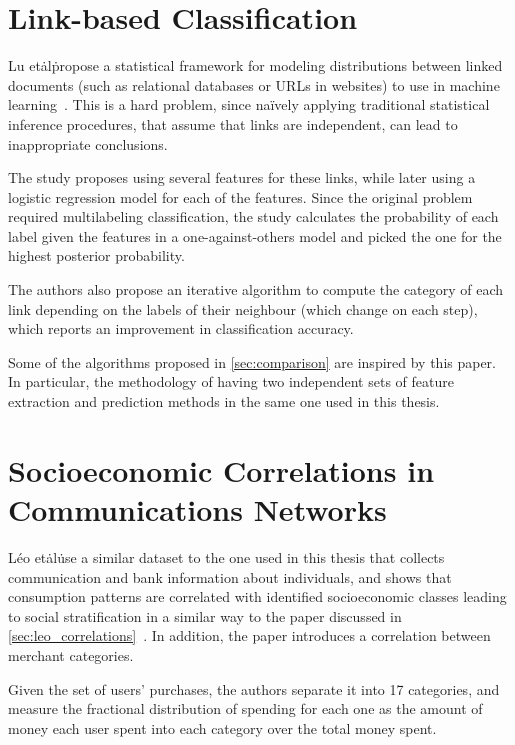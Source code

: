 \section{Link-based Classification}

Lu et\. al\. propose a statistical framework for modeling distributions between linked documents (such as relational databases or URLs in websites) to use in machine learning~\cite{lu2003link}. This is a hard problem, since naïvely applying traditional statistical inference procedures, that assume that links are independent, can lead to inappropriate conclusions\cite{jensen1999statistical}.

The study proposes using several features for these links, while later using a logistic regression model for each of the features. Since the original problem required multilabeling classification, the study calculates the probability of each label given the features in a one-against-others model and picked the one for the highest posterior probability.

The authors also propose an iterative algorithm to compute the category of each link depending on the labels of their neighbour (which change on each step), which reports an improvement in classification accuracy.

Some of the algorithms proposed in \cref{sec:comparison} are inspired by this paper.
In particular, the methodology of having two independent sets of feature extraction and prediction methods in the same one used in this thesis.

\section{Socioeconomic Correlations in Communications Networks}

Léo et\. al\. use a similar dataset to the one used in this thesis that collects communication and bank information about individuals, and shows that consumption patterns are correlated with identified socioeconomic classes leading to social stratification in a similar way to the paper discussed in \cref{sec:leo_correlations}~\cite{leo2015socioeconomic}.
In addition, the paper introduces a correlation between merchant categories.

Given the set of users' purchases, the authors separate it into 17 categories, and measure the fractional distribution of spending for each one as the amount of money each user spent into each category over the total money spent.

